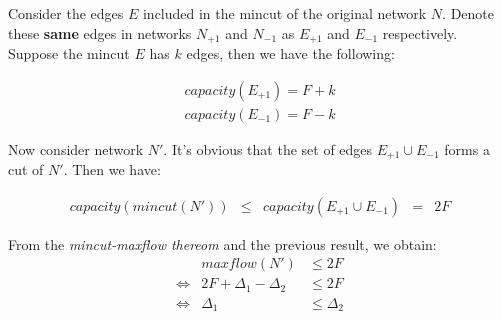 Consider the edges $E$ included in the mincut of the original network $N$. Denote these \textbf{same} edges in networks $N_{+1}$ and $N_{-1}$ as $E_{+1}$ and $E_{-1}$ respectively. Suppose the mincut $E$ has $k$ edges, then we have the following:

\[
  \begin{array}{c}
    capacity(E_{+1}) = F + k \\
    capacity(E_{-1}) = F - k
  \end{array}
\]

\noindent
Now consider network $N\prime$. It's obvious that the set of edges $E_{+1} \cup E_{-1}$ forms a cut of $N\prime$. Then we have:

\[
  \begin{array}{lllll}
    capacity(mincut(N\prime)) & \leq & capacity(E_{+1} \cup E_{-1}) & = & 2F
  \end{array}
\]

From the \textit{mincut-maxflow thereom} and the previous result, we obtain:
\[
  \begin{array}{lrl}
         & maxflow(N\prime)         & \leq 2F \\
    \iff & 2F + \Delta_1 - \Delta_2 & \leq 2F \\
    \iff & \Delta_1                 & \leq \Delta_2 \\
  \end{array}
\]

